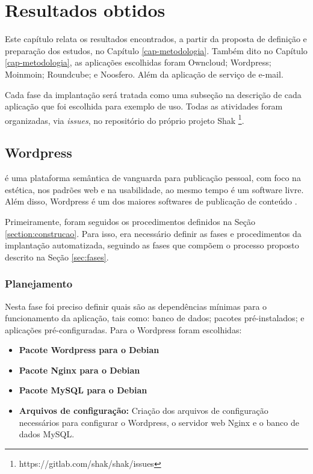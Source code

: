 \chapter{Resultados obtidos}
\label{cap-resultados}
Este capítulo relata os resultados encontrados, a partir da proposta de
definição e preparação dos estudos, no Capítulo \ref{cap-metodologia}. Também dito 
no Capítulo \ref{cap-metodologia}, as aplicações escolhidas foram  
Owncloud; Wordpress; Moinmoin; Roundcube; e Noosfero. Além da aplicação de serviço
de e-mail.
 
Cada fase da implantação será tratada como uma 
subseção na descrição de cada aplicação que foi escolhida para exemplo de uso. 
Todas as atividades foram organizadas,
via \textit{issues}, no repositório do próprio projeto Shak 
\footnote{https://gitlab.com/shak/shak/issues}.

\section{Wordpress}
\label{sub:wordpress}

 é uma plataforma semântica de vanguarda para publicação pessoal, 
com foco na estética, nos padrões web e na usabilidade, ao mesmo tempo é 
um software livre. Além disso, Wordpress é um dos maiores softwares de 
publicação de conteúdo . 

Primeiramente, foram seguidos os procedimentos definidos na Seção 
\ref{section:construcao}. Para isso, era
necessário definir as fases e procedimentos da implantação automatizada,
seguindo as fases que compõem o processo proposto descrito na Seção \ref{sec:fases}.

\subsection{Planejamento}

Nesta fase foi preciso definir quais são as dependências mínimas
para o funcionamento da aplicação, tais como: banco de dados; pacotes
pré-instalados; e aplicações pré-configuradas. Para o Wordpress foram escolhidas:

\begin{itemize}
   \item \textbf{Pacote Wordpress para o Debian} 
   \item \textbf{Pacote Nginx para o Debian} 
   \item \textbf{Pacote MySQL para o Debian}
   \item \textbf{Arquivos de configuração:} Criação dos arquivos de configuração
   necessários para configurar o Wordpress, o servidor web Nginx e o banco de dados
   MySQL.
\end{itemize}

